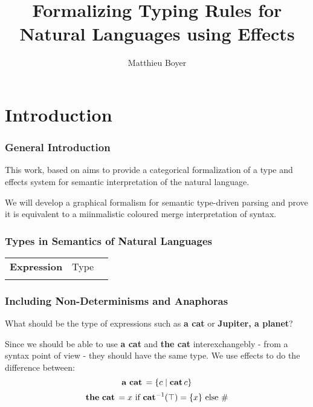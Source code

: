 \documentclass[math, english, info, noamsthm]{beamercours}
\title{Formalizing Typing Rules for Natural Languages using Effects}
\author{Matthieu Boyer}
\begin{document}
\maketitle

\section{Introduction}
\begin{frame}
	\frametitle{General Introduction}
	This work, based on \cite{bumfordEffectdrivenInterpretationFunctors2025} aims
	to provide a categorical formalization of a type and effects system for
	semantic interpretation of the natural language.

	\medskip

	We will develop a graphical formalism for semantic type-driven parsing and prove it is
	equivalent to a miinmalistic coloured merge interpretation of syntax.
\end{frame}

\begin{frame}[fragile]
	\frametitle{Types in Semantics of Natural Languages}
	\setcellgapes{3pt}
	\makegapedcells
	\begin{NiceTabular}{>{\bf}LLL}
		Expression & \rm Type & \lambda{} \\
		\CodeAfter
	\end{NiceTabular}
\end{frame}

\begin{frame}[fragile]
	\frametitle{Including Non-Determinisms and Anaphoras}
	What should be the type of expressions such as \textbf{a cat} or \textbf{Jupiter, a planet}?
	\pause

	\smallskip

	Since we should be able to use \textbf{a cat} and \textbf{the cat} interexchangebly - from a syntax point of view - they should have the same type.
	We use effects to do the difference between:
	\begin{equation*}
		\mathbf{a\ cat}\, = \{c \mid \mathbf{cat}\, c\}
	\end{equation*}
	\begin{equation*}
		\mathbf{the\ cat}\, = x \text{ if } \mathbf{cat}^{-1}(\top) = \{x\} \text{ else } \#
	\end{equation*}
\end{frame}
\end{document}
